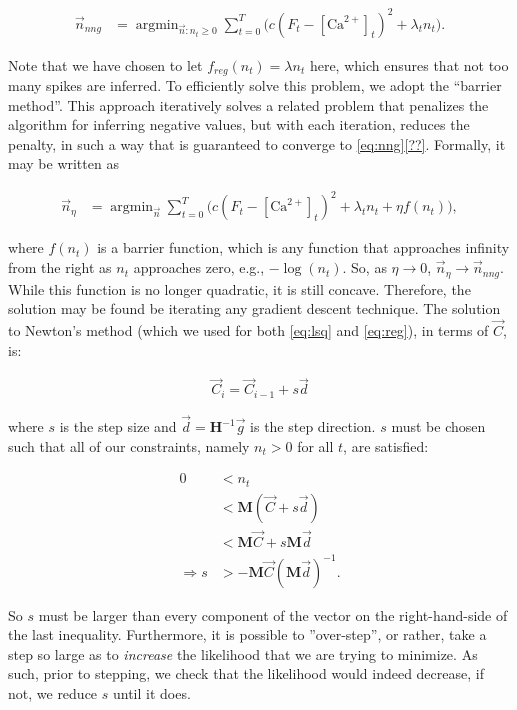 \documentclass[12pt]{article}
\providecommand{\ve}[1]{\vec{#1}}
\providecommand{\ma}[1]{\boldsymbol{#1}}
\providecommand{\ve}[1]{\boldsymbol{#1}}
\DeclareMathOperator*{\argmin}{argmin}
\newcommand{\Ca}{[\text{Ca}^{2+}]}
\newcommand{\Cav}{\ve{C}}%
\begin{document}
\begin{align} \label{eq:nng}
\ve{n}_{nng} &= \argmin_{\ve{n}: n_t \geq 0} \sum_{t=0}^T \big(c(F_t - \Ca_t)^2 +  \lambda_t n_t\big).
\end{align}

\noindent Note that we have chosen to let $f_{reg}(n_t)=\lambda n_t$ here, which ensures that not too many spikes are inferred. To efficiently solve this problem, we adopt the ``barrier method''.  This approach iteratively solves a related problem that penalizes the algorithm for inferring negative values, but with each iteration, reduces the penalty, in such a way that is guaranteed to converge to \eqref{eq:nng}\ref{??}.  Formally, it may be written as

\begin{align} \label{eq:b}
\ve{n}_{\eta} &= \argmin_{\ve{n}} \sum_{t=0}^T \big(c(F_t - \Ca_t)^2  + \lambda_t n_t + \eta f(n_t)\big),
\end{align}

\noindent where $f(n_t)$ is a barrier function, which is any function that approaches infinity from the right as $n_t$ approaches zero, e.g., $-\log(n_t)$.  So, as $\eta \rightarrow 0$, $\ve{n}_{\eta} \rightarrow \ve{n}_{nng}$. While this function is no longer quadratic, it is still concave. Therefore, the solution may be found be iterating any gradient descent technique.  The solution to Newton's method (which we used for both \eqref{eq:lsq} and \eqref{eq:reg}), in terms of $\Cav$, is:

\begin{align} \label{eq:newton}
\Cav_i = \Cav_{i-1} + s \ve{d}
\end{align}

\noindent where $s$ is the step size and $\ve{d}=\ma{H}^{-1}\ve{g}$ is the step direction.  $s$ must be chosen such that all of our constraints, namely $n_t>0$ for all $t$, are satisfied:

\begin{align}
0&< n_t\\
&< \ma{M}(\ve{C} + s \ve{d})\\
&< \ma{M} \ve{C} + s \ma{M} \ve{d}\\
\Rightarrow s &> -\ma{M}\ve{C} (\ma{M} \ve{d})^{-1}. \label{eq:s}
\end{align}

So $s$ must be larger than every component of the vector on the right-hand-side of the last inequality.  Furthermore, it is possible to ''over-step'', or rather, take a step so large as to \emph{increase} the likelihood that we are trying to minimize.  As such, prior to stepping, we check that the likelihood would indeed decrease, if not, we reduce $s$ until it does.
\end{document}
